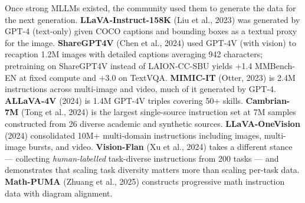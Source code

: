Once strong MLLMs existed, the community used them to generate the data for the next generation. \textbf{LLaVA-Instruct-158K} (Liu et al., 2023) was generated by GPT-4 (text-only) given COCO captions and bounding boxes as a textual proxy for the image. \textbf{ShareGPT4V} (Chen et al., 2024) used GPT-4V (with vision) to recaption 1.2M images with detailed captions averaging 942 characters; pretraining on ShareGPT4V instead of LAION-CC-SBU yields +1.4 MMBench-EN at fixed compute and +3.0 on TextVQA. \textbf{MIMIC-IT} (Otter, 2023) is 2.4M instructions across multi-image and video, much of it generated by GPT-4. \textbf{ALLaVA-4V} (2024) is 1.4M GPT-4V triples covering 50+ skills. \textbf{Cambrian-7M} (Tong et al., 2024) is the largest single-source instruction set at 7M samples constructed from 26 diverse academic and synthetic sources. \textbf{LLaVA-OneVision} (2024) consolidated 10M+ multi-domain instructions including images, multi-image bursts, and video. \textbf{Vision-Flan} (Xu et al., 2024) takes a different stance --- collecting \emph{human-labelled} task-diverse instructions from 200 tasks --- and demonstrates that scaling task diversity matters more than scaling per-task data. \textbf{Math-PUMA} (Zhuang et al., 2025) constructs progressive math instruction data with diagram alignment.

